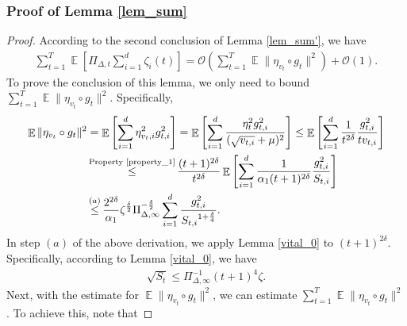 \documentclass{article} %
\DeclareMathOperator{\Expect}{\mathbb{E}}
\begin{document}
\subsubsection{Proof of Lemma \ref{lem_sum}}
\begin{proof}
According to the second conclusion of Lemma \ref{lem_sum'}, we have
\begin{align*}
    \sum_{t=1}^{T}\Expect\left[\Pi_{\Delta,t}\sum_{i=1}^{d}\zeta_{i}(t)\right]=\mathcal{O}\left(\sum_{t=1}^{T}\Expect\|\eta_{v_{t}}\circ g_{t}\|^{2}\right)+\mathcal{O}(1).
\end{align*}
To prove the conclusion of this lemma, we only need to bound $\sum_{t=1}^{T}\Expect\|\eta_{v_{t}}\circ g_{t}\|^{2}.$ Specifically,
\begin{align}\label{Gamma_t}
\Expect\|\eta_{v_{t}}\circ g_{t}\|^{2}&=\Expect\left[\sum_{i=1}^{d}\eta_{v_{t},i}^{2}g_{t,i}^{2}\right]=\Expect\left[\sum_{i=1}^{d}\frac{\eta_{t}^{2}g_{t,i}^{2}}{(\sqrt{v_{t,i}}+\mu)^{2}}\right]\le \Expect\left[\sum_{i=1}^{d}\frac{1}{t^{2\delta}}\frac{g_{t,i}^{2}}{{tv_{t,i}}}\right]\notag\\&\mathop{\le}^{\text{Property \ref{property_1}}}\frac{(t+1)^{2\delta}}{t^{2\delta}}\Expect\left[\sum_{i=1}^{d}\frac{1}{\alpha_{1}(t+1)^{2\delta}}\frac{g_{t,i}^{2}}{{S_{t,i}}}\right]\\
&\mathop{\le}^{(a)}\frac{2^{2\delta}}{\alpha_{1}}{\zeta}^{\frac{\delta}{2}}\Pi^{-\frac{\delta}{2}}_{\Delta,\infty}\sum_{i=1}^{d}\frac{g_{t,i}^{2}}{{S_{t,i}}^{1+\frac{\delta}{4}}}.
\end{align}
In step $(a)$ of the above derivation, we apply Lemma \ref{vital_0} to $(t+1)^{2\delta}$. Specifically, according to Lemma \ref{vital_0}, we have
\begin{align*}
\sqrt{S_{t}}\le \Pi_{\Delta,\infty}^{-1}(t+1)^{4}\zeta.
\end{align*}
Next, with the estimate for $\Expect\|\eta_{v_{t}}\circ g_{t}\|^{2}$, we can estimate $\sum_{t=1}^{T}\Expect\|\eta_{v_{t}}\circ g_{t}\|^{2}$. To achieve this, note that

\end{proof}
\end{document}
